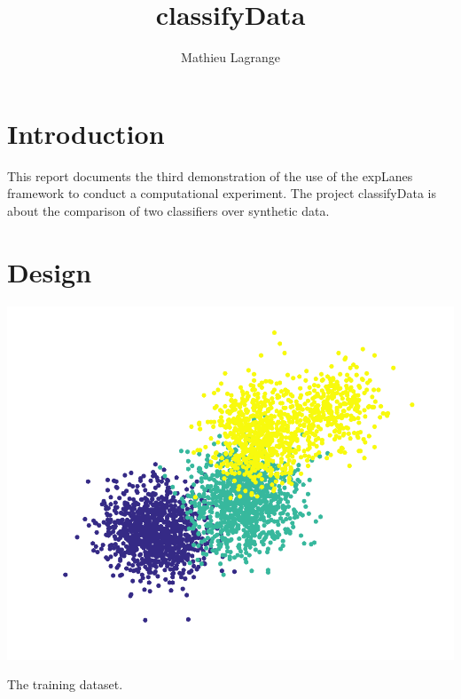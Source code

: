 \documentclass[12pt,a4paper,fleqn]{tufte-handout}
\title{classifyData}
\author{ Mathieu Lagrange }
\begin{document}
 
  
\maketitle 
  
  
\section{Introduction}

This report documents the third demonstration of the use of the expLanes framework to conduct a computational experiment. The project classifyData is about the comparison of two classifiers over synthetic data.

\section{Design}

\begin{marginfigure}
\includegraphics[width=\textwidth]{figures/scatter1}
\caption{The training dataset.}
\label{train}
\end{marginfigure}
\end{document}
